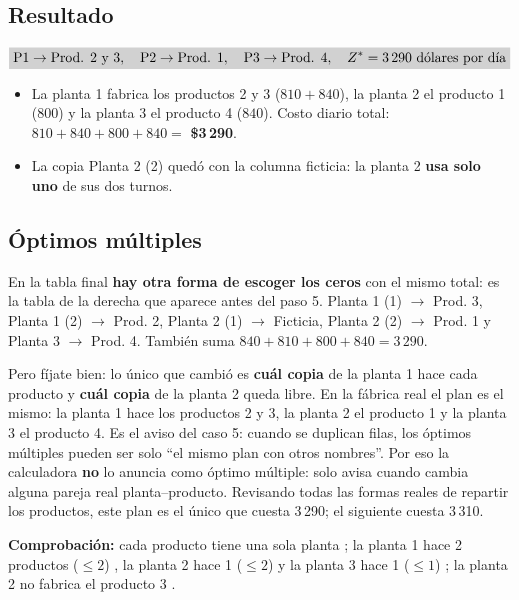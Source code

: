 \documentclass[11pt,a4paper]{article}
\begin{document}
\subsection*{Resultado}
\[
\res{\text{P1} \to \text{Prod. 2 y 3},\quad \text{P2} \to \text{Prod. 1},\quad \text{P3} \to \text{Prod. 4},\quad Z^* = 3\,290 \text{ dólares por día}}
\]
\begin{itemize}[itemsep=2pt]
  \item La planta 1 fabrica los productos 2 y 3 ($810 + 840$), la planta 2 el producto 1 ($800$) y la planta 3 el
        producto 4 ($840$). Costo diario total: $810 + 840 + 800 + 840 = $ \textbf{\$3\,290}.
  \item La copia Planta 2 (2) quedó con la columna ficticia: la planta 2 \textbf{usa solo uno} de sus dos turnos.
\end{itemize}

\subsection*{Óptimos múltiples}
En la tabla final \textbf{hay otra forma de escoger los ceros} con el mismo total: es la tabla de la derecha que aparece antes del paso 5.
Planta 1 (1) $\to$ Prod. 3, Planta 1 (2) $\to$ Prod. 2, Planta 2 (1) $\to$ Ficticia, Planta 2 (2) $\to$ Prod. 1 y
Planta 3 $\to$ Prod. 4. También suma $840 + 810 + 800 + 840 = 3\,290$.

Pero fíjate bien: lo único que cambió es \textbf{cuál copia} de la planta 1 hace cada producto y \textbf{cuál copia}
de la planta 2 queda libre. En la fábrica real el plan es el mismo: la planta 1 hace los productos 2 y 3, la planta 2
el producto 1 y la planta 3 el producto 4. Es el aviso del caso 5: cuando se duplican filas, los óptimos múltiples
pueden ser solo ``el mismo plan con otros nombres''. Por eso la calculadora \textbf{no} lo anuncia como óptimo
múltiple: solo avisa cuando cambia alguna pareja real planta--producto. Revisando todas las formas reales de repartir
los productos, este plan es el único que cuesta 3\,290; el siguiente cuesta 3\,310.

\textbf{Comprobación:} cada producto tiene una sola planta \checkmark; la planta 1 hace 2 productos
($\le 2$) \checkmark, la planta 2 hace 1 ($\le 2$) \checkmark{} y la planta 3 hace 1 ($\le 1$) \checkmark; la planta 2 no
fabrica el producto 3 \checkmark.
\end{document}
